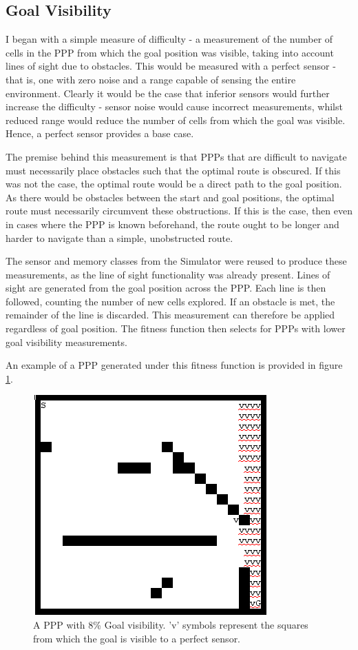 \documentclass[authoryearcitations]{UoYCSproject}
\begin{document}
\subsection{Goal Visibility}
\label{sec:goal_vis}
I began with a simple measure of difficulty - a measurement of the number of cells in the PPP from which the goal position was visible, taking into account lines of sight due to obstacles. This would be measured with a perfect sensor - that is, one with zero noise and a range capable of sensing the entire environment. Clearly it would be the case that inferior sensors would further increase the difficulty - sensor noise would cause incorrect measurements, whilst reduced range would reduce the number of cells from which the goal was visible. Hence, a perfect sensor provides a base case.

The premise behind this measurement is that PPPs that are difficult to navigate must necessarily place obstacles such that the optimal route is obscured. If this was not the case, the optimal route would be a direct path to the goal position. As there would be obstacles between the start and goal positions, the optimal route must necessarily circumvent these obstructions. If this is the case, then even in cases where the PPP is known beforehand, the route ought to be longer and harder to navigate than a simple, unobstructed route.

The sensor and memory classes from the Simulator were reused to produce these measurements, as the line of sight functionality was already present. Lines of sight are generated from the goal position across the PPP. Each line is then followed, counting the number of new cells explored. If an obstacle is met, the remainder of the line is discarded. This measurement can therefore be applied regardless of goal position. The fitness function then selects for PPPs with lower goal visibility measurements.

An example of a PPP generated under this fitness function is provided in figure \ref{fig:goal_vis_ppp}.

\begin{figure}
\graphicspath{ {DesignImpPics/} }
\includegraphics[scale=0.65]{visFromGoal.png}
\caption{A PPP with 8\% Goal visibility. 'v' symbols represent the squares from which the goal is visible to a perfect sensor.}
\label{fig:goal_vis_ppp}
\end{figure}
\end{document}

